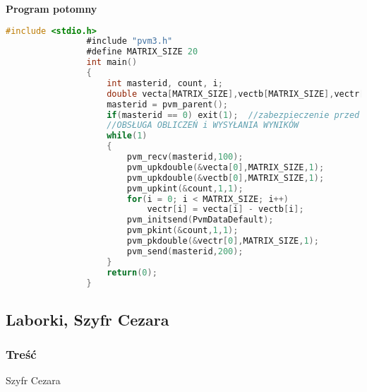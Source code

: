 			\newpage
			\textbf{Program potomny}
			\begin{lstlisting}[language=C]
				#include <stdio.h>
				#include "pvm3.h"
				#define MATRIX_SIZE 20
				int main()
				{
					int masterid, count, i;
					double vecta[MATRIX_SIZE],vectb[MATRIX_SIZE],vectr[MATRIX_SIZE];
					masterid = pvm_parent();
					if(masterid == 0) exit(1);	//zabezpieczenie przed uruchomieniem z poziomu rodzica
					//OBSŁUGA OBLICZEŃ i WYSYŁANIA WYNIKÓW
					while(1)
					{
						pvm_recv(masterid,100);
						pvm_upkdouble(&vecta[0],MATRIX_SIZE,1);
						pvm_upkdouble(&vectb[0],MATRIX_SIZE,1);
						pvm_upkint(&count,1,1);
						for(i = 0; i < MATRIX_SIZE; i++)
							vectr[i] = vecta[i] - vectb[i];
						pvm_initsend(PvmDataDefault);
						pvm_pkint(&count,1,1);
						pvm_pkdouble(&vectr[0],MATRIX_SIZE,1);
						pvm_send(masterid,200);		
					}
					return(0);
				}
			\end{lstlisting}
	\newpage
	\subsection{Laborki, Szyfr Cezara}
		\subsubsection{Treść}
			Szyfr Cezara
